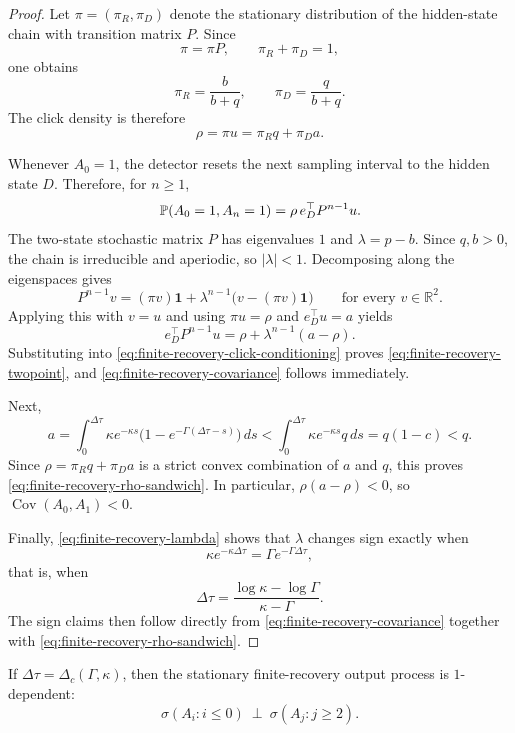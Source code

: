 \begin{proof}
Let $\pi=(\pi_R,\pi_D)$ denote the stationary distribution of the hidden-state chain with transition matrix $P$. Since
\[
\pi=\pi P,
\qquad
\pi_R+\pi_D=1,
\]
one obtains
\[
\pi_R=\frac{b}{b+q},
\qquad
\pi_D=\frac{q}{b+q}.
\]
The click density is therefore
\[
\rho=\pi u=\pi_R q+\pi_D a.
\]

Whenever $A_0=1$, the detector resets the next sampling interval to the hidden state $D$. Therefore, for $n\ge 1$,
\begin{equation}\label{eq:finite-recovery-click-conditioning}
\mathbb{P}(A_0=1,A_n=1)
=
\rho\, e_D^\top P^{n-1}u.
\end{equation}
The two-state stochastic matrix $P$ has eigenvalues $1$ and $\lambda=p-b$. Since $q,b>0$, the chain is irreducible and aperiodic, so $|\lambda|<1$. Decomposing along the eigenspaces gives
\[
P^{n-1}v
=
(\pi v)\mathbf 1+\lambda^{n-1}\bigl(v-(\pi v)\mathbf 1\bigr)
\qquad\text{for every }v\in\mathbb R^2.
\]
Applying this with $v=u$ and using $\pi u=\rho$ and $e_D^\top u=a$ yields
\[
e_D^\top P^{n-1}u
=
\rho+\lambda^{n-1}(a-\rho).
\]
Substituting into \eqref{eq:finite-recovery-click-conditioning} proves \eqref{eq:finite-recovery-twopoint}, and \eqref{eq:finite-recovery-covariance} follows immediately.

Next,
\[
a
=
\int_0^{\Delta\tau}\kappa e^{-\kappa s}\bigl(1-e^{-\Gamma(\Delta\tau-s)}\bigr)\,ds
<
\int_0^{\Delta\tau}\kappa e^{-\kappa s}q\,ds
=
q(1-c)
<
q.
\]
Since $\rho=\pi_R q+\pi_D a$ is a strict convex combination of $a$ and $q$, this proves \eqref{eq:finite-recovery-rho-sandwich}. In particular, $\rho(a-\rho)<0$, so $\operatorname{Cov}(A_0,A_1)<0$.

Finally, \eqref{eq:finite-recovery-lambda} shows that $\lambda$ changes sign exactly when
\[
\kappa e^{-\kappa\Delta\tau}=\Gamma e^{-\Gamma\Delta\tau},
\]
that is, when
\[
\Delta\tau=\frac{\log\kappa-\log\Gamma}{\kappa-\Gamma}.
\]
The sign claims then follow directly from \eqref{eq:finite-recovery-covariance} together with \eqref{eq:finite-recovery-rho-sandwich}.
\end{proof}

\begin{corollary}\label{cor:finite-recovery-1dependent}
If $\Delta\tau=\Delta_c(\Gamma,\kappa)$, then the stationary finite-recovery output process is $1$-dependent:
\[
\sigma(A_i:i\le 0)\ \perp\ \sigma(A_j:j\ge 2).
\]
\end{corollary}

